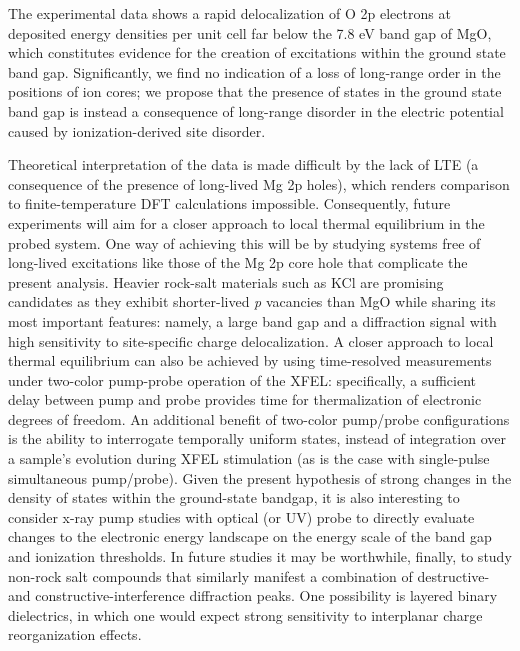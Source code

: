 The experimental data shows a rapid delocalization of O 2p electrons at
deposited energy densities per unit cell far below the 7.8 eV band gap
of MgO, which constitutes evidence for the creation of excitations
within the ground state band gap. Significantly, we find no indication
of a loss of long-range order in the positions of ion cores; we propose
that the presence of states in the ground state band gap is instead a
consequence of long-range disorder in the electric potential caused by
ionization-derived site disorder.

Theoretical interpretation of the data is made difficult by the lack of
LTE (a consequence of the presence of long-lived Mg 2p holes), which
renders comparison to finite-temperature DFT calculations impossible.
Consequently, future experiments will aim for a closer approach to local
thermal equilibrium in the probed system. One way of achieving this will
be by studying systems free of long-lived excitations like those of the
Mg 2p core hole that complicate the present analysis. Heavier rock-salt
materials such as KCl are promising candidates as they exhibit
shorter-lived \emph{p} vacancies than MgO while sharing its most
important features: namely, a large band gap and a diffraction signal
with high sensitivity to site-specific charge delocalization. A closer
approach to local thermal equilibrium can also be achieved by using
time-resolved measurements under two-color pump-probe operation of the
XFEL: specifically, a sufficient delay between pump and probe provides
time for thermalization of electronic degrees of freedom. An additional
benefit of two-color pump/probe configurations is the ability to
interrogate temporally uniform states, instead of integration over a
sample's evolution during XFEL stimulation (as is the case with
single-pulse simultaneous pump/probe). Given the present hypothesis of
strong changes in the density of states within the ground-state bandgap,
it is also interesting to consider x-ray pump studies with optical (or
UV) probe to directly evaluate changes to the electronic energy
landscape on the energy scale of the band gap and ionization thresholds.
In future studies it may be worthwhile, finally, to study non-rock salt
compounds that similarly manifest a combination of destructive- and
constructive-interference diffraction peaks. One possibility is layered
binary dielectrics, in which one would expect strong sensitivity to
interplanar charge reorganization effects.


